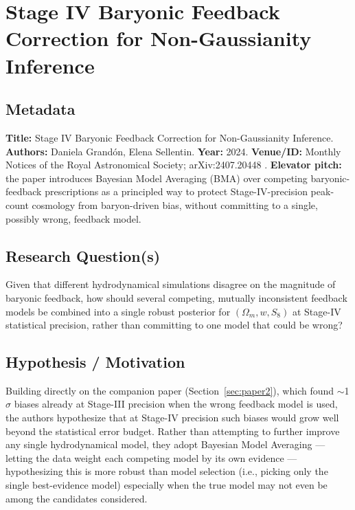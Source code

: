 \documentclass[11pt]{article}
\begin{document}
\section{Stage IV Baryonic Feedback Correction for Non-Gaussianity Inference}
\label{sec:paper3}

\subsection{Metadata}
\textbf{Title:} Stage IV Baryonic Feedback Correction for Non-Gaussianity Inference. \textbf{Authors:} Daniela Grandón, Elena Sellentin. \textbf{Year:} 2024. \textbf{Venue/ID:} Monthly Notices of the Royal Astronomical Society; arXiv:2407.20448 \citep{grandon2024bma}. \textbf{Elevator pitch:} the paper introduces Bayesian Model Averaging (BMA) over competing baryonic-feedback prescriptions as a principled way to protect Stage-IV-precision peak-count cosmology from baryon-driven bias, without committing to a single, possibly wrong, feedback model.

\subsection{Research Question(s)}
Given that different hydrodynamical simulations disagree on the magnitude of baryonic feedback, how should several competing, mutually inconsistent feedback models be combined into a single robust posterior for $(\Omega_m, w, S_8)$ at Stage-IV statistical precision, rather than committing to one model that could be wrong?

\subsection{Hypothesis / Motivation}
Building directly on the companion paper (Section~\ref{sec:paper2}), which found $\sim$1$\sigma$ biases already at Stage-III precision when the wrong feedback model is used, the authors hypothesize that at Stage-IV precision such biases would grow well beyond the statistical error budget. Rather than attempting to further improve any single hydrodynamical model, they adopt Bayesian Model Averaging — letting the data weight each competing model by its own evidence — hypothesizing this is more robust than model selection (i.e., picking only the single best-evidence model) especially when the true model may not even be among the candidates considered.
\end{document}
